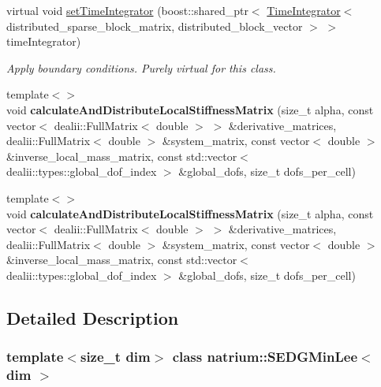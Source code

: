 \begin{DoxyCompactItemize}
\item 
virtual void \hyperlink{classnatrium_1_1SEDGMinLee_add96facb8df190a139505ea912bb1a75}{setTimeIntegrator} (boost::shared\_\-ptr$<$ \hyperlink{classnatrium_1_1TimeIntegrator}{TimeIntegrator}$<$ distributed\_\-sparse\_\-block\_\-matrix, distributed\_\-block\_\-vector $>$ $>$ timeIntegrator)
\begin{DoxyCompactList}\small\item\em Apply boundary conditions. Purely virtual for this class. \item\end{DoxyCompactList}\item 
\hypertarget{classnatrium_1_1SEDGMinLee_a6b207f31315f80f2a91a4063c1ab8f84}{
{\footnotesize template$<$$>$ }\\void {\bfseries calculateAndDistributeLocalStiffnessMatrix} (size\_\-t alpha, const vector$<$ dealii::FullMatrix$<$ double $>$ $>$ \&derivative\_\-matrices, dealii::FullMatrix$<$ double $>$ \&system\_\-matrix, const vector$<$ double $>$ \&inverse\_\-local\_\-mass\_\-matrix, const std::vector$<$ dealii::types::global\_\-dof\_\-index $>$ \&global\_\-dofs, size\_\-t dofs\_\-per\_\-cell)}
\label{classnatrium_1_1SEDGMinLee_a6b207f31315f80f2a91a4063c1ab8f84}

\item 
\hypertarget{classnatrium_1_1SEDGMinLee_a0f83e4fb7ded82cc27fb60f6d6ff5a17}{
{\footnotesize template$<$$>$ }\\void {\bfseries calculateAndDistributeLocalStiffnessMatrix} (size\_\-t alpha, const vector$<$ dealii::FullMatrix$<$ double $>$ $>$ \&derivative\_\-matrices, dealii::FullMatrix$<$ double $>$ \&system\_\-matrix, const vector$<$ double $>$ \&inverse\_\-local\_\-mass\_\-matrix, const std::vector$<$ dealii::types::global\_\-dof\_\-index $>$ \&global\_\-dofs, size\_\-t dofs\_\-per\_\-cell)}
\label{classnatrium_1_1SEDGMinLee_a0f83e4fb7ded82cc27fb60f6d6ff5a17}

\end{DoxyCompactItemize}


\subsection{Detailed Description}
\subsubsection*{template$<$size\_\-t dim$>$ class natrium::SEDGMinLee$<$ dim $>$}

